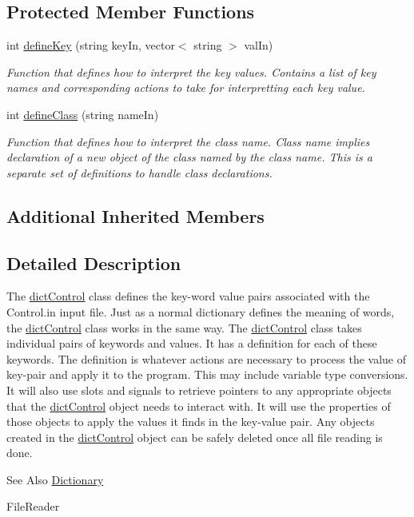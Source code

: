 \subsection*{Protected Member Functions}
\begin{DoxyCompactItemize}
\item 
int \hyperlink{classdict_control_a8acd1846982a698adab13e790121b1ad}{define\-Key} (string key\-In, vector$<$ string $>$ val\-In)
\begin{DoxyCompactList}\small\item\em Function that defines how to interpret the key values. Contains a list of key names and corresponding actions to take for interpretting each key value. \end{DoxyCompactList}\item 
int \hyperlink{classdict_control_a77dea969cac1ad6cdd61358ebb4b5ea1}{define\-Class} (string name\-In)
\begin{DoxyCompactList}\small\item\em Function that defines how to interpret the class name. Class name implies declaration of a new object of the class named by the class name. This is a separate set of definitions to handle class declarations. \end{DoxyCompactList}\end{DoxyCompactItemize}
\subsection*{Additional Inherited Members}


\subsection{Detailed Description}
The \hyperlink{classdict_control}{dict\-Control} class defines the key-\/word value pairs associated with the Control.\-in input file. Just as a normal dictionary defines the meaning of words, the \hyperlink{classdict_control}{dict\-Control} class works in the same way. The \hyperlink{classdict_control}{dict\-Control} class takes individual pairs of keywords and values. It has a definition for each of these keywords. The definition is whatever actions are necessary to process the value of key-\/pair and apply it to the program. This may include variable type conversions. It will also use slots and signals to retrieve pointers to any appropriate objects that the \hyperlink{classdict_control}{dict\-Control} object needs to interact with. It will use the properties of those objects to apply the values it finds in the key-\/value pair. Any objects created in the \hyperlink{classdict_control}{dict\-Control} object can be safely deleted once all file reading is done. \begin{DoxySeeAlso}{See Also}
\hyperlink{class_dictionary}{Dictionary} 

File\-Reader 
\end{DoxySeeAlso}


